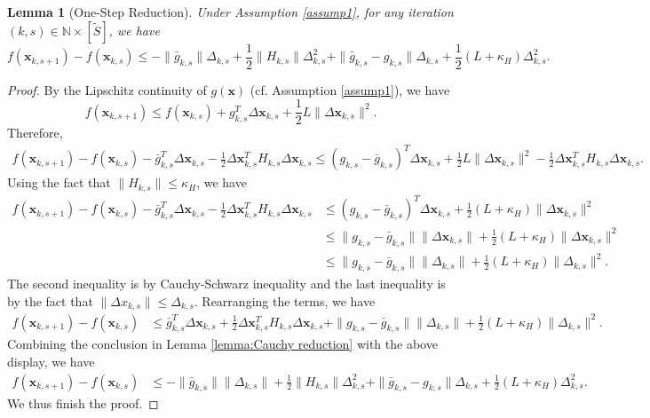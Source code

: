 \documentclass{article}
\newcommand{\bx}{\boldsymbol{x}}
\newcommand{\barg}{\bar{g}}
\theoremstyle{plain}
\newtheorem{lemma}[theorem]{Lemma}
\theoremstyle{definition}
\theoremstyle{remark}
\begin{document}
\begin{lemma}[One-Step Reduction]\label{lem:One-Step Reduction}
Under Assumption \ref{assump1}, for any iteration $(k,s)\in \mathbb{N}\times [\tilde{S}]$, we have
\begin{equation*}
 f(\bx_{k,s+1}) - f(\bx_{k,s}) \leq -\|\barg_{k,s}\|\Delta_{k,s} + \frac{1}{2}\|H_{k,s}\|\Delta_{k,s}^2 + \|\barg_{k,s} - g_{k,s} \|\Delta_{k,s} + \frac{1}{2}(L + \kappa_H)\Delta_{k,s}^2.   
\end{equation*}
\end{lemma}

\begin{proof}
By the Lipschitz continuity of $g(\bx)$ (cf. Assumption \ref{assump1}), we have
\begin{equation*}
f(\bx_{k,s+1}) \leq f(\bx_{k,s}) + g_{k,s}^T\Delta \bx_{k,s} + \frac{1}{2}L\|\Delta \bx_{k,s}\|^2.
\end{equation*}
Therefore,
\begin{align*}
   f(\bx_{k,s+1}) - f(\bx_{k,s}) - \barg_{k,s}^T\Delta \bx_{k,s} - \frac{1}{2}\Delta \bx_{k,s}^T H_{k,s}\Delta \bx_{k,s} \leq  (g_{k,s} - \barg_{k,s})^T\Delta \bx_{k,s} + \frac{1}{2}L\|\Delta \bx_{k,s}\|^2 - \frac{1}{2}\Delta \bx_{k,s}^T H_{k,s}\Delta \bx_{k,s}.
\end{align*}
Using the fact that $\|H_{k,s}\|\leq \kappa_H$, we have
\begin{align*}
    f(\bx_{k,s+1}) - f(\bx_{k,s}) - \barg_{k,s}^T\Delta \bx_{k,s} - \frac{1}{2}\Delta \bx_{k,s}^T H_{k,s}\Delta \bx_{k,s} & \leq (g_{k,s} - \barg_{k,s})^T\Delta \bx_{k,s} + \frac{1}{2}(L+\kappa_H)\|\Delta \bx_{k,s}\|^2\\
    & \leq \|g_{k,s} - \barg_{k,s}\| \|\Delta \bx_{k,s} \| + \frac{1}{2}(L+\kappa_H)\|\Delta \bx_{k,s}\|^2 \\
    & \leq \|g_{k,s} - \barg_{k,s}\| \|\Delta_{k,s} \| + \frac{1}{2}(L+\kappa_H)\|\Delta_{k,s}\|^2.
\end{align*}
The second inequality is by Cauchy-Schwarz inequality and the last inequality is by the fact that $\|\Delta x_{k,s}\| \leq \Delta_{k,s}$. Rearranging the terms, we have
\begin{align*}
    f(\bx_{k,s+1}) - f(\bx_{k,s}) & \leq  \barg_{k,s}^T\Delta \bx_{k,s} + \frac{1}{2}\Delta \bx_{k,s}^T H_{k,s}\Delta \bx_{k,s} + \|g_{k,s} - \barg_{k,s}\| \|\Delta_{k,s} \| + \frac{1}{2}(L+\kappa_H)\|\Delta_{k,s}\|^2.
\end{align*}
Combining the conclusion in Lemma \ref{lemma:Cauchy reduction} with the above display, we have
\begin{align*}
    f(\bx_{k,s+1}) - f(\bx_{k,s}) & \leq  -\|\barg_{k,s}\| \|\Delta_{k,s}\| + \frac{1}{2}\|H_{k,s} \| \Delta_{k,s}^2 + \|\barg_{k,s} - g_{k,s} \| \Delta_{k,s} + \frac{1}{2}(L+\kappa_H)\Delta_{k,s}^2.
\end{align*}
We thus finish the proof.
\end{proof}
\end{document}
